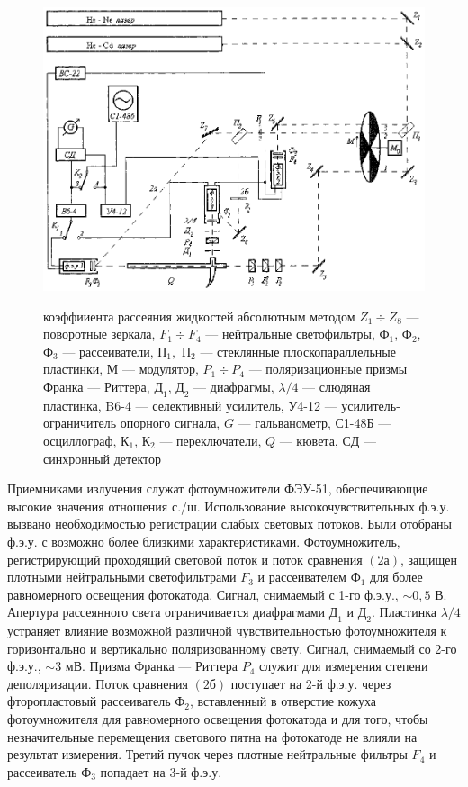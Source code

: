 \begin{center}
\begin{figure}[t]
\centerline{\hbox{\includegraphics[scale=0.8]{Ris/ris_eps/ris5_3d.eps}}}

{\ris 
коэффииента
рассеяния жидкостей абсолютным методом 
$Z_1\div Z_8$ ---
поворотные зеркала, $F_1\div F_4$ --- нейтральные светофильтры,
$Ф_1$, $Ф_2$, 
$Ф_3$ --- рассеиватели, $П_1,$ $П_2$ --- стеклянные
плоскопараллельные пластинки,
$М$ --- модулятор, $P_1\div P_4$
--- поляризационные призмы Франка --- Риттера, $Д_1$, $Д_2$ ---
диафрагмы, 
$\lambda/4$ --- слюдяная пластинка, B6-4 ---
селективный усилитель,
У4-12 --- усилитель-ограничитель опорного
сигнала, $G$ --- гальванометр, 
С1-48Б --- осциллограф, $К_1$,
$К_2$ --- переключатели, $Q$ --- кювета, $СД$ --- синхронный
детектор}
\vskip -8mm
\end{figure}
\end{center}

Приемниками излучения служат фотоумножители ФЭУ-51,
обеспечивающие высокие значения отношения с./ш. Использование
высокочувствительных ф.э.у. вызвано необходимостью регистрации
слабых световых потоков. Были отобраны ф.э.у. с возможно более
близкими характеристиками. Фотоумножитель, регистрирующий
проходящий световой поток и поток сравнения $(2а)$, защищен
плотными нейтральными светофильтрами $F_3$ и рассеивателем $Ф_1$
для более равномерного освещения фотокатода. Сигнал, снимаемый с
1-го ф.э.у., $\sim0,5$ В. Апертура рассеянного света
ограничивается диафрагмами $Д_1$ и $Д_2$. Пластинка $\lambda/4$
устраняет влияние возможной различной чувствительностью
фотоумножителя к горизонтально и вертикально поляризованному
свету. Сигнал, снимаемый со 2-го ф.э.у., $\sim3$ мВ. Призма
Франка --- Риттера $P_4$ служит для измерения степени
деполяризации. Поток сравнения $(2б)$ поступает на 2-й ф.э.у.
через фторопластовый рассеиватель $Ф_2$, вставленный в отверстие
кожуха фотоумножителя для равномерного освещения фотокатода и для
того, чтобы незначительные перемещения светового пятна на
фотокатоде не влияли на результат измерения. Третий пучок через
плотные нейтральные фильтры $F_4$ и рассеиватель $Ф_3$ попадает
на 3-й ф.э.у.

